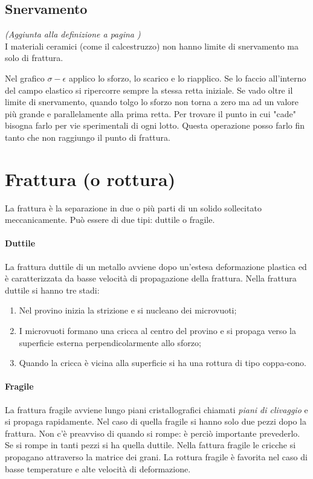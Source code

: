 \documentclass[a5paper,12pt]{article}
\begin{document}
\subsection{Snervamento}
\textit{(Aggiunta alla definizione a pagina \pageref{snerv})\\}
I materiali ceramici (come il calcestruzzo) non hanno limite di snervamento ma solo di frattura. 

Nel grafico $\sigma - \epsilon$ applico lo sforzo, lo scarico e lo riapplico. Se lo faccio all'interno del campo elastico si ripercorre sempre la stessa retta iniziale. Se vado oltre il limite di snervamento, quando tolgo lo sforzo non torna a zero ma ad un valore più grande e parallelamente alla prima retta. Per trovare il punto in cui "cade" bisogna farlo per vie sperimentali di ogni lotto. Questa operazione posso farlo fin tanto che non raggiungo il punto di frattura.
\section{Frattura (o rottura)}
La frattura è la separazione in due o più parti di un solido sollecitato meccanicamente. Può essere di due tipi: duttile o fragile.  
\paragraph{Duttile} La frattura duttile di un metallo avviene dopo un'estesa deformazione plastica ed è caratterizzata da basse velocità di propagazione della frattura. Nella frattura duttile si hanno tre stadi: 
\begin{enumerate}
	\item Nel provino inizia la strizione e si nucleano dei microvuoti;
	\item I microvuoti formano una cricca al centro del provino e si propaga verso la superficie esterna perpendicolarmente allo sforzo;
	\item Quando la cricca è vicina alla superficie si ha una rottura di tipo coppa-cono.
\end{enumerate}

\paragraph{Fragile} La frattura fragile avviene lungo piani cristallografici chiamati \emph{piani di clivaggio} e si propaga rapidamente. Nel caso di quella fragile si hanno solo due pezzi dopo la frattura. Non c'è preavviso di quando si rompe: è perciò importante prevederlo. Se si rompe in tanti pezzi si ha quella duttile.
Nella fattura fragile le cricche si propagano attraverso la matrice dei grani.
La rottura fragile è favorita nel caso di basse temperature e alte velocità di deformazione.
\end{document}
